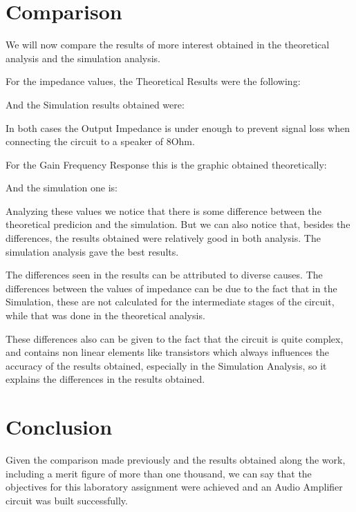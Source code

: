 \newpage
\section{Comparison}
\label{sec:comparison}
\par
We will now compare the results of more interest obtained in the theoretical analysis and the simulation analysis.\par


For the impedance values, the Theoretical Results were the following:



And the Simulation results obtained were:


 


In both cases the Output Impedance is under enough to prevent signal loss when connecting the circuit to a speaker of 8Ohm.


For the Gain Frequency Response this is the graphic obtained theoretically:


And the simulation one is:


Analyzing these values we notice that there is some difference between the theoretical predicion and the simulation. But we can also notice that, besides the differences, the results obtained were relatively good in both analysis. The simulation analysis gave the best results.

The differences seen in the results can be attributed to diverse causes. The differences between the values of impedance can be due to the fact that in the Simulation, these are not calculated for the intermediate stages of the circuit, while that was done in the theoretical analysis.\par
These differences also can be given to the fact that the circuit is quite complex, and contains non linear elements like transistors which always influences the accuracy of the results obtained, especially in the Simulation Analysis, so it explains the differences in the results obtained.\par


\newpage
\section{Conclusion}
\label{sec:conclusion}

Given the comparison made previously and the results obtained along the work, including a merit figure of more than one thousand, we can say that the objectives for this laboratory assignment were achieved and an Audio Amplifier circuit was built successfully. 





